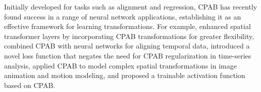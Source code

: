 Initially developed for tasks such as alignment and regression, CPAB has recently found success in a range of neural network applications, establishing it as an effective framework for learning transformations. For example, \citet{detlefsen2018deep} enhanced spatial transformer layers by incorporating CPAB transformations for greater flexibility, \citet{martinez2022closed} combined CPAB with neural networks for aligning temporal data, \citet{weber2023regularization} introduced a novel loss function that negates the need for CPAB regularization in time-series analysis, \citet{wang2024continuous} applied CPAB to model complex spatial transformations in image animation and motion modeling, and \citet{Chelly2024DiTAC} proposed a trainable activation function based on CPAB.
\fi